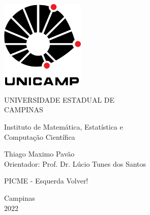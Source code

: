 \begin{titlepage}
    \begin{center}
        \includegraphics[width=0.3\textwidth]{imgs/university.png}
        
        \vspace*{1.5cm}

        \LARGE{UNIVERSIDADE ESTADUAL DE\\ CAMPINAS}

        \vspace{0.7cm}

        \Large{Instituto de Matemática, Estatística e\\ Computação Científica}

        \vspace*{2cm}
        
        Thiago Maximo Pavão\\ \small Orientador: Prof. Dr. Lúcio Tunes dos Santos
        
        \vspace*{2cm}

        \Huge{PICME - Esquerda Volver!}

        \vfill
        
        \Large
        Campinas\\
        2022
        
    \end{center}
\end{titlepage}